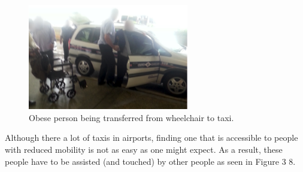 \begin{list}{-}{}
\begin{figure}[h]
  \centering
     \includegraphics[width=7cm]{images/image039}
   \caption{Obese person being transferred from wheelchair to taxi.}
  \label{fig:39}
\end{figure}

  \item Although there a lot of taxis in airports, finding one that is accessible to people with reduced mobility is not as easy as one might expect. As a result, these people have to be assisted (and touched) by other people as seen in Figure 3 8.
\end{list}

